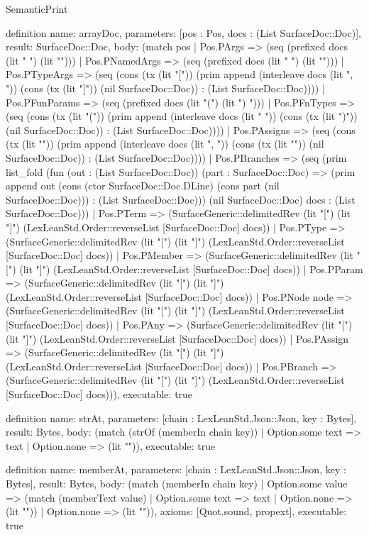 \begin{lexlean}{SemanticPrint}
\begin{semanticmodule}
definition{
  name: arrayDoc,
  parameters: [pos : Pos, docs : (List SurfaceDoc::Doc)],
  result: SurfaceDoc::Doc,
  body: (match pos
    | Pos.PArgs => (seq (prefixed docs (lit " ") (lit "")))
    | Pos.PNamedArgs => (seq (prefixed docs (lit " ") (lit "")))
    | Pos.PTypeArgs => (seq (cons (tx (lit "[")) (prim append (interleave docs (lit ", ")) (cons (tx (lit "]")) (nil SurfaceDoc::Doc)) : (List SurfaceDoc::Doc))))
    | Pos.PFunParams => (seq (prefixed docs (lit "(") (lit ") ")))
    | Pos.PFnTypes => (seq (cons (tx (lit "(")) (prim append (interleave docs (lit " ")) (cons (tx (lit ")")) (nil SurfaceDoc::Doc)) : (List SurfaceDoc::Doc))))
    | Pos.PAssigns => (seq (cons (tx (lit "{")) (prim append (interleave docs (lit ", ")) (cons (tx (lit "}")) (nil SurfaceDoc::Doc)) : (List SurfaceDoc::Doc))))
    | Pos.PBranches => (seq (prim list_fold (fun (out : (List SurfaceDoc::Doc)) (part : SurfaceDoc::Doc) => (prim append out (cons (ctor SurfaceDoc::Doc.DLine) (cons part (nil SurfaceDoc::Doc))) : (List SurfaceDoc::Doc))) (nil SurfaceDoc::Doc) docs : (List SurfaceDoc::Doc)))
    | Pos.PTerm => (SurfaceGeneric::delimitedRev (lit "[") (lit "]") (LexLeanStd.Order::reverseList [SurfaceDoc::Doc] docs))
    | Pos.PType => (SurfaceGeneric::delimitedRev (lit "[") (lit "]") (LexLeanStd.Order::reverseList [SurfaceDoc::Doc] docs))
    | Pos.PMember => (SurfaceGeneric::delimitedRev (lit "[") (lit "]") (LexLeanStd.Order::reverseList [SurfaceDoc::Doc] docs))
    | Pos.PParam => (SurfaceGeneric::delimitedRev (lit "[") (lit "]") (LexLeanStd.Order::reverseList [SurfaceDoc::Doc] docs))
    | Pos.PNode node => (SurfaceGeneric::delimitedRev (lit "[") (lit "]") (LexLeanStd.Order::reverseList [SurfaceDoc::Doc] docs))
    | Pos.PAny => (SurfaceGeneric::delimitedRev (lit "[") (lit "]") (LexLeanStd.Order::reverseList [SurfaceDoc::Doc] docs))
    | Pos.PAssign => (SurfaceGeneric::delimitedRev (lit "[") (lit "]") (LexLeanStd.Order::reverseList [SurfaceDoc::Doc] docs))
    | Pos.PBranch => (SurfaceGeneric::delimitedRev (lit "[") (lit "]") (LexLeanStd.Order::reverseList [SurfaceDoc::Doc] docs))),
  executable: true
}

definition{
  name: strAt,
  parameters: [chain : LexLeanStd.Json::Json, key : Bytes],
  result: Bytes,
  body: (match (strOf (memberIn chain key)) | Option.some text => text | Option.none => (lit "")),
  executable: true
}

definition{
  name: memberAt,
  parameters: [chain : LexLeanStd.Json::Json, key : Bytes],
  result: Bytes,
  body: (match (memberIn chain key)
    | Option.some value => (match (memberText value)
      | Option.some text => text
      | Option.none => (lit ""))
    | Option.none => (lit "")),
  axioms: [Quot.sound, propext],
  executable: true
}


\end{semanticmodule}
\end{lexlean}
